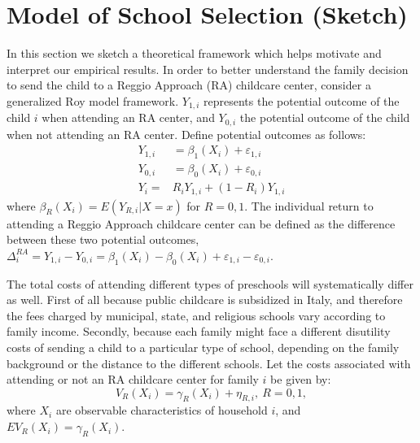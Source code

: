 \documentclass[12pt]{article}
\begin{document}
\section{Model of School Selection (Sketch)}
\label{sec:model}

In this section we sketch a theoretical framework which helps motivate and interpret our empirical results. In order to better understand the family decision to send the child to a Reggio Approach (RA) childcare center, consider a generalized Roy model framework. $Y_{1,i}$ represents the potential outcome of the child $i$ when attending an RA center, and $Y_{0,i}$ the potential outcome of the child when not attending an RA center. Define potential outcomes as follows:
\begin{align}
Y_{1,i}& =\beta_{1}(X_{i})+\varepsilon_{1,i} \nonumber \\
Y_{0,i}& =\beta_{0}(X_{i})+\varepsilon_{0,i} \nonumber \\
Y_{i} =& R_{i}Y_{1,i} + (1-R_{i}) Y_{1,i} \label{eq:outcome}
\end{align}%
where $\beta_{R}(X_{i})=E(Y_{R,i}|X=x)$ for $R=0,1$. The individual return to attending a Reggio Approach childcare center can be defined as the difference between these two potential outcomes, $\Delta_{i}^{RA}=Y_{1,i}-Y_{0,i}=\beta_{1}(X_{i})-\beta_{0}(X_{i})+\varepsilon_{1,i}-\varepsilon_{0,i}$.

The total costs of attending different types of preschools will systematically differ as well. First of all because public childcare is subsidized in Italy, and therefore the fees charged by municipal, state, and religious schools vary according to family income. %
Secondly, because each family might face a different disutility costs of sending a child to a particular type of school, depending on the family background or the distance to the different schools. 
Let the costs associated with attending or not an RA childcare center for family $i$ be given by:
\begin{equation*}
V_{R}(X_{i})=\gamma_{R}(X_{i})+\eta_{R,i},\ R=0,1,
\end{equation*}%
where $X_{i}$ are observable characteristics of household $i$, and $EV_{R}(X_{i})=\gamma_{R}(X_{i}).$
\end{document}
